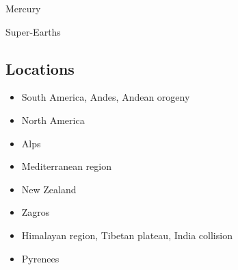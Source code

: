 Mercury \cite{reki07,king08} 

Super-Earths \cite{stfl11}\cite{stlh13}

\subsection*{Locations}

\begin{itemize}
\item South America, Andes, Andean orogeny 
\cite{wdbo94b}
\cite{baso05}\cite{soba05}
\cite{basv06}
\cite{hucf12}
\cite{robn16}
\item North America 
\cite{huha90}
\cite{bugm97}
\cite{besb06}
\cite{splg08}
\cite{splg09}
\item Alps 
\cite{pfsb02}
\cite{pimo03}
\cite{buge05}
\cite{vifj08}
\cite{luws13}
\cite{scdu15}
\item Mediterranean region 
\cite{pimo97}
\cite{pimo03}
\cite{bofb10}
\item {New Zealand} 
\cite{koon90}
\cite{brbe95}
\cite{bekh96}
\cite{babr99}
\cite{libi06}
\cite{gedh02}\cite{pybf02}
\cite{gehd03}\cite{konc03}\cite{upke03}
\cite{pyeg10}
\cite{grel12}
\item {Zagros}
\cite{vech06}
\cite{hamo10}
\cite{yakm11}
\cite{nipc13}
\cite{frba14}
\cite{ghbu14}
\cite{coyc16}
\cite{rugb17}
\item {Himalayan region, Tibetan plateau, India collision} 
\cite{bird78}
\cite{tapl82}
\cite{vidm84}
\cite{peta88}
\cite{moln89}
\cite{moem93}
\cite{wibe94}
\cite{chmm95}\cite{leka95}
\cite{robk97}
\cite{vasb99}
\cite{cblk00}\cite{clro00}
\cite{bejn01}\cite{laav01}\cite{zemk01}\cite{tazr01}
\cite{kozc02}
\cite{reta03}
\cite{bejn04}
\cite{clbr05}\cite{rost05a}\cite{rost05b}
\cite{clrw06}
\cite{busc08}
\cite{hamo10}
\cite{befa11}\cite{zhxy11}
\cite{zams12}
\cite{care13}\cite{mutg13}\cite{chgz13}\cite{chgz13b}
\cite{whbb14}
\cite{bube17}
\cite{pirf18}
\cite{sccs19}\cite{scvm19}
\item {Pyrenees} 
\cite{giju98}
\cite{bemh00}
\cite{mcmg04}
\cite{jaml10}
\cite{vime12}

\end{itemize}
